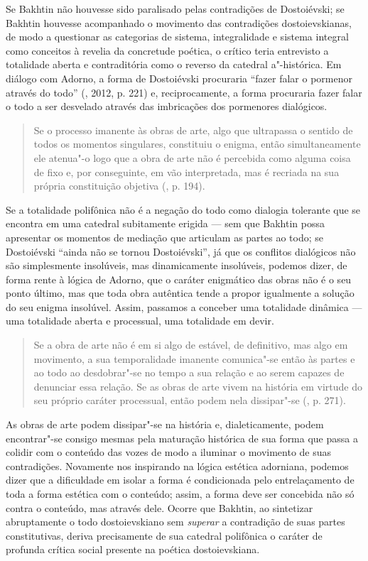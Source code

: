 Se Bakhtin não houvesse sido paralisado pelas contradições de
Dostoiévski; se Bakhtin houvesse acompanhado o movimento das
contradições dostoievskianas, de modo a questionar as categorias de
sistema, integralidade e sistema integral como conceitos à revelia da
concretude poética, o crítico teria entrevisto a totalidade aberta e
contraditória como o reverso da catedral a"-histórica. Em diálogo com
Adorno, a forma de Dostoiévski procuraria ``fazer falar o pormenor
através do todo'' (, 2012, p. 221) e, reciprocamente, a forma
procuraria fazer falar o todo a ser desvelado através das imbricações
dos pormenores dialógicos.

\begin{quote}
Se o processo imanente às obras de arte, algo que ultrapassa o sentido
de todos os momentos singulares, constituiu o enigma, então
simultaneamente ele atenua"-o logo que a obra de arte não é percebida
como alguma coisa de fixo e, por conseguinte, em vão interpretada, mas é
recriada na sua própria constituição objetiva (, p. 194).
\end{quote}

Se a totalidade polifônica não é a negação do todo como dialogia
tolerante que se encontra em uma catedral subitamente erigida --- sem que
Bakhtin possa apresentar os momentos de mediação que articulam as partes
ao todo; se Dostoiévski ``ainda não se tornou Dostoiévski'', já que os
conflitos dialógicos não são simplesmente insolúveis, mas dinamicamente
insolúveis, podemos dizer, de forma rente à lógica de Adorno, que o
caráter enigmático das obras não é o seu ponto último, mas que toda obra
autêntica tende a propor igualmente a solução do seu enigma insolúvel.
Assim, passamos a conceber uma totalidade dinâmica --- uma totalidade
aberta e processual, uma totalidade em devir.

\begin{quote}
Se a obra de arte não é em si algo de estável, de definitivo, mas algo
em movimento, a sua temporalidade imanente comunica"-se então às partes e
ao todo ao desdobrar"-se no tempo a sua relação e ao serem capazes de
denunciar essa relação. Se as obras de arte vivem na história em virtude
do seu próprio caráter processual, então podem nela dissipar"-se (,
p. 271).
\end{quote}

As obras de arte podem dissipar"-se na história e, dialeticamente, podem
encontrar"-se consigo mesmas pela maturação histórica de sua forma que
passa a colidir com o conteúdo das vozes de modo a iluminar o movimento
de suas contradições. Novamente nos inspirando na lógica estética
adorniana, podemos dizer que a dificuldade em isolar a forma é
condicionada pelo entrelaçamento de toda a forma estética com o
conteúdo; assim, a forma deve ser concebida não só contra o conteúdo,
mas através dele. Ocorre que Bakhtin, ao sintetizar abruptamente o todo
dostoievskiano sem \emph{superar} a contradição de suas partes
constitutivas, deriva precisamente de sua catedral polifônica o caráter
de profunda crítica social presente na poética dostoievskiana.

